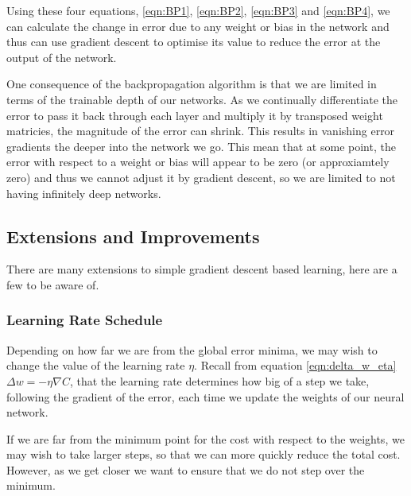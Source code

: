 Using these four equations, \ref{eqn:BP1}, \ref{eqn:BP2}, \ref{eqn:BP3} and \ref{eqn:BP4}, we can calculate the change in error due to any weight or bias in the network and thus can use gradient descent to optimise its value to reduce the error at the output of the network.

One consequence of the backpropagation algorithm is that we are limited in terms of the trainable depth of our networks. As we continually differentiate the error to pass it back through each layer and multiply it by transposed weight matricies, the magnitude of the error can shrink. This results in vanishing error gradients the deeper into the network we go. This mean that at some point, the error with respect to a weight or bias will appear to be zero (or approxiamtely zero) and thus we cannot adjust it by gradient descent, so we are limited to not having infinitely deep networks.

\subsection{Extensions and Improvements}
There are many extensions to simple gradient descent based learning, here are a few to be aware of.
\subsubsection{Learning Rate Schedule}
\label{sec:lr_sch}
Depending on how far we are from the global error minima, we may wish to change the value of the learning rate $\eta$. Recall from equation \ref{eqn:delta_w_eta} $\Delta w = -\eta \nabla C$, that the learning rate determines how big of a step we take, following the gradient of the error, each time we update the weights of our neural network.

If we are far from the minimum point for the cost with respect to the weights, we may wish to take larger steps, so that we can more quickly reduce the total cost. However, as we get closer we want to ensure that we do not step over the minimum.

